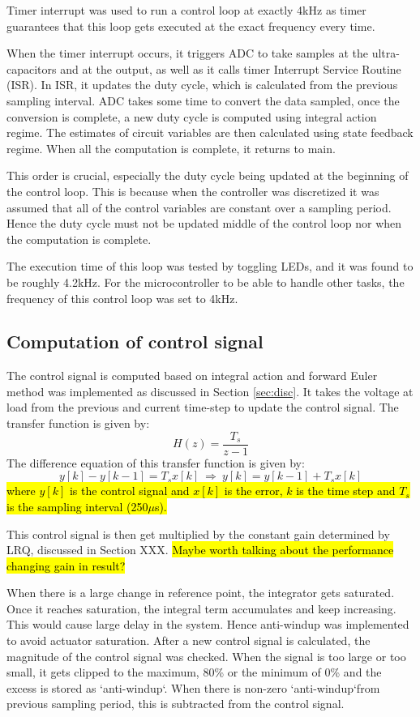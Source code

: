 Timer interrupt was used to run a control loop at exactly 4kHz as timer guarantees that this loop gets executed at the exact frequency every time. 

When the timer interrupt occurs, it triggers ADC to take samples at the ultra-capacitors and at the output, as well as it calls timer Interrupt Service Routine (ISR). In ISR, it updates the duty cycle, which is calculated from the previous sampling interval. ADC takes some time to convert the data sampled, once the conversion is complete, a new duty cycle is computed using integral action regime. The estimates of circuit variables are then calculated using state feedback regime. When all the computation is complete, it returns to main. 

This order is crucial, especially the duty cycle being updated at the beginning of the control loop. This is because when the controller was discretized it was assumed that all of the control variables are constant over a sampling period. Hence the duty cycle must not be updated middle of the control loop nor when the computation is complete.

The execution time of this loop was tested by toggling LEDs, and it was found to be roughly 4.2kHz. For the microcontroller to be able to handle other tasks, the frequency of this control loop was set to 4kHz.

\subsection{Computation of control signal}
The control signal is computed based on integral action and forward Euler method was implemented as discussed in Section \ref{sec:disc}. It takes the voltage at load from the previous and current time-step to update the control signal. The transfer function is given by:
\[
    H(z) = \frac{T_s}{z-1}
\]
The difference equation of this transfer function is given by:
\[
    y[k] - y[k-1] = T_s x[k] \: \Longrightarrow \: y[k] = y[k-1] + T_s x[k]
\]
\hl{where $y[k]$ is the control signal and $x[k]$ is the error, $k$ is the time step and $T_s$ is the sampling interval (250$\mu$s).}

This control signal is then get multiplied by the constant gain determined by LRQ, discussed in Section XXX. 
\hl{Maybe worth talking about the performance changing gain in result?}

When there is a large change in reference point, the integrator gets saturated. Once it reaches saturation, the integral term accumulates and keep increasing. This would cause large delay in the system. Hence anti-windup was implemented to avoid actuator saturation. After a new control signal is calculated, the magnitude of the control signal was checked. When the signal is too large or too small, it gets clipped to the maximum, 80\% or the minimum of 0\% and the excess is stored as \lq anti-windup\lq. When there is non-zero \lq anti-windup\lq from previous sampling period, this is subtracted from the control signal. 

